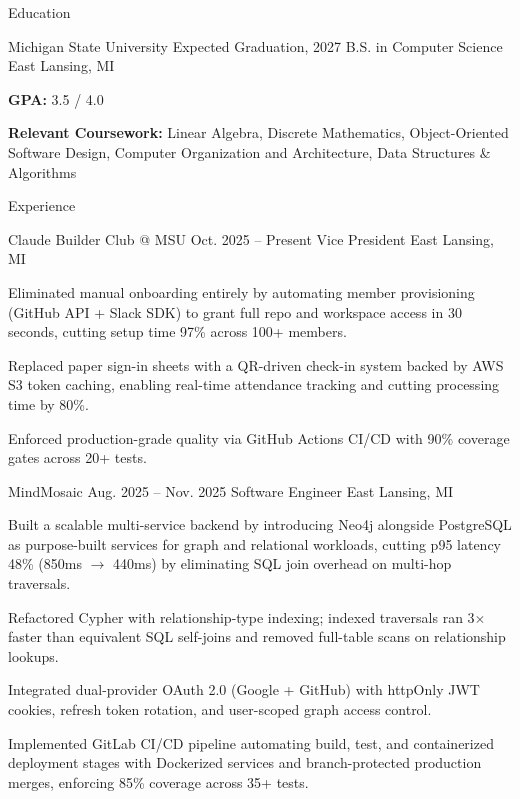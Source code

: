 \documentclass[
	11pt
]{../../../resume}
\begin{document}
	\begin{rSection}{E}{ducation}
		\begin{rSectionEntry}
			{Michigan State University}
			{Expected Graduation, 2027}
			{B.S. in Computer Science}
			{}
			{East Lansing, MI}

			\item \textbf{GPA:} 3.5 / 4.0
			\item \textbf{Relevant Coursework:} Linear Algebra, Discrete Mathematics, Object-Oriented Software Design, Computer Organization and Architecture, Data Structures \& Algorithms
		\end{rSectionEntry}
	\end{rSection}

	\begin{rSection}{E}{xperience}
		\begin{rSectionEntry}
			{Claude Builder Club @ MSU}
			{Oct. 2025 -- Present}
			{Vice President}
			{}
			{East Lansing, MI}

			\item Eliminated manual onboarding entirely by automating member provisioning (GitHub API + Slack SDK) to grant full repo and workspace access in 30 seconds, cutting setup time 97\% across 100+ members.
			\item Replaced paper sign-in sheets with a QR-driven check-in system backed by AWS S3 token caching, enabling real-time attendance tracking and cutting processing time by 80\%.
			\item Enforced production-grade quality via GitHub Actions CI/CD with 90\% coverage gates across 20+ tests.
		\end{rSectionEntry}

		\begin{rSectionEntry}
			{MindMosaic}
			{Aug. 2025 -- Nov. 2025}
			{Software Engineer}
			{}
			{East Lansing, MI}

			\item Built a scalable multi-service backend by introducing Neo4j alongside PostgreSQL as purpose-built services for graph and relational workloads, cutting p95 latency 48\% (850ms $\rightarrow$ 440ms) by eliminating SQL join overhead on multi-hop traversals.
			\item Refactored Cypher with relationship-type indexing; indexed traversals ran 3$\times$ faster than equivalent SQL self-joins and removed full-table scans on relationship lookups.
			\item Integrated dual-provider OAuth 2.0 (Google + GitHub) with httpOnly JWT cookies, refresh token rotation, and user-scoped graph access control.
			\item Implemented GitLab CI/CD pipeline automating build, test, and containerized deployment stages with Dockerized services and branch-protected production merges, enforcing 85\% coverage across 35+ tests.
		\end{rSectionEntry}
	\end{rSection}
\end{document}

